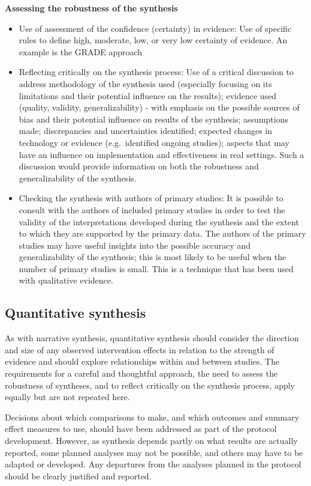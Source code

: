 \documentclass[
  11pt,
  a4paper,
  DIV=11,
  numbers=noendperiod]{scrreprt}
\begin{document}
\textbf{Assessing the robustness of the synthesis}

\begin{itemize}
\item
  Use of assessment of the confidence (certainty) in evidence: Use of
  specific rules to define high, moderate, low, or very low certainty of
  evidence. An example is the GRADE approach
\item
  Reflecting critically on the synthesis process: Use of a critical
  discussion to address methodology of the synthesis used (especially
  focusing on its limitations and their potential influence on the
  results); evidence used (quality, validity, generalizability) - with
  emphasis on the possible sources of bias and their potential influence
  on results of the synthesis; assumptions made; discrepancies and
  uncertainties identified; expected changes in technology or evidence
  (e.g.~identified ongoing studies); aspects that may have an influence
  on implementation and effectiveness in real settings. Such a
  discussion would provide information on both the robustness and
  generalizability of the synthesis.
\item
  Checking the synthesis with authors of primary studies: It is possible
  to consult with the authors of included primary studies in order to
  test the validity of the interpretations developed during the
  synthesis and the extent to which they are supported by the primary
  data. The authors of the primary studies may have useful insights into
  the possible accuracy and generalizability of the synthesis; this is
  most likely to be useful when the number of primary studies is small.
  This is a technique that has been used with qualitative evidence.
\end{itemize}

\subsection{Quantitative synthesis}\label{quantitative-synthesis}

As with narrative synthesis, quantitative synthesis should consider the
direction and size of any observed intervention effects in relation to
the strength of evidence and should explore relationships within and
between studies. The requirements for a careful and thoughtful approach,
the need to assess the robustness of syntheses, and to reflect
critically on the synthesis process, apply equally but are not repeated
here.

Decisions about which comparisons to make, and which outcomes and
summary effect measures to use, should have been addressed as part of
the protocol development. However, as synthesis depends partly on what
results are actually reported, some planned analyses may not be
possible, and others may have to be adapted or developed. Any departures
from the analyses planned in the protocol should be clearly justified
and reported.
\end{document}

